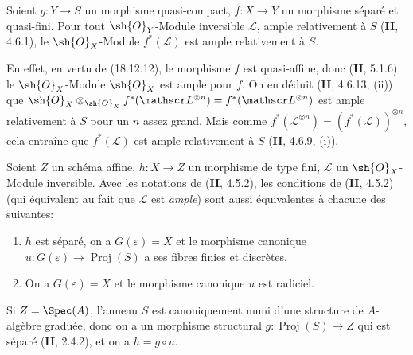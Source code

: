 \begin{proposition}[18.12.16]
\label{IV.18.12.16}
Soient $g:Y\to S$ un morphisme quasi-compact, $f:X\to Y$ un morphisme séparé et quasi-fini. Pour tout $\sh{O}_Y$-Module inversible $\mathscr L$, ample relativement à $S$ \textup{(\textbf{II}, 4.6.1)}, \textup{le} $\sh{O}_X$-Module $f^*(\mathscr L)$ est ample relativement à $S$.
\end{proposition}

En effet, en vertu de (18.12.12), le morphisme $f$ est quasi-affine, donc (\textbf{II}, 5.1.6) le $\sh{O}_X$-Module $\sh{O}_X$ est ample pour $f$. On en déduit (\textbf{II}, 4.6.13, (ii)) que $\sh{O}_X\otimes_{\sh{O}_X}f^*(\mathscr L^{\otimes n})=f^*(\mathscr L^{\otimes n})$ est ample relativement à $S$ pour un $n$ assez grand. Mais comme $f^*(\mathscr L^{\otimes n})=(f^*(\mathscr L))^{\otimes n}$, cela entraîne que $f^*(\mathscr L)$ est ample relativement à $S$ (\textbf{II}, 4.6.9, (i)).

\begin{corollary}[18.12.17]
\label{IV.18.12.17}
Soient $Z$ un schéma affine, $h:X\to Z$ un morphisme de type fini, $\mathscr L$ un $\sh{O}_X$-Module inversible. Avec les notations de \textup{(\textbf{II}, 4.5.2)}, les conditions de \textup{(\textbf{II}, 4.5.2)} \textup{(qui équivalent au fait que $\mathscr L$ est \emph{ample})} sont aussi équivalentes à chacune des suivantes:
\begin{enumerate}
  \item[\textup{b$''$)}] $h$ est séparé, on a $G(\varepsilon)=X$ et le morphisme canonique $u:G(\varepsilon)\to\operatorname{Proj}(S)$ a ses fibres finies et discrètes.
  \item[\textup{b$'''$)}] On a $G(\varepsilon)=X$ et le morphisme canonique $u$ est radiciel.
\end{enumerate}
\end{corollary}

Si $Z=\Spec(A)$, l'anneau $S$ est canoniquement muni d'une structure de $A$-algèbre graduée, donc on a un morphisme structural $g:\operatorname{Proj}(S)\to Z$ qui est séparé (\textbf{II}, 2.4.2), et on a $h=g\circ u$.

